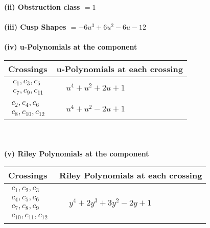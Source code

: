 \documentclass[1p]{elsarticle_modified}
\theoremstyle{definition}
\begin{document}
\flushleft \textbf{(ii) Obstruction class $= 1$}\\~\\
\flushleft \textbf{(iii) Cusp Shapes $= -6 u^3+6 u^2-6 u-12$}\\~\\
\newpage\renewcommand{\arraystretch}{1}
\flushleft \textbf{(iv) u-Polynomials at the component}\newline \\
\begin{tabular}{m{50pt}|m{274pt}}
Crossings & \hspace{64pt}u-Polynomials at each crossing \\
\hline $$\begin{aligned}c_{1},c_{3},c_{5}\\c_{7},c_{9},c_{11}\end{aligned}$$&$\begin{aligned}
&u^4+u^2+2 u+1
\end{aligned}$\\
\hline $$\begin{aligned}c_{2},c_{4},c_{6}\\c_{8},c_{10},c_{12}\end{aligned}$$&$\begin{aligned}
&u^4+u^2-2 u+1
\end{aligned}$\\
\hline
\end{tabular}\\~\\
\newpage\renewcommand{\arraystretch}{1}
\flushleft \textbf{(v) Riley Polynomials at the component}\newline \\
\begin{tabular}{m{50pt}|m{274pt}}
Crossings & \hspace{64pt}Riley Polynomials at each crossing \\
\hline $$\begin{aligned}c_{1},c_{2},c_{3}\\c_{4},c_{5},c_{6}\\c_{7},c_{8},c_{9}\\c_{10},c_{11},c_{12}\end{aligned}$$&$\begin{aligned}
&y^4+2 y^3+3 y^2-2 y+1
\end{aligned}$\\
\hline
\end{tabular}\\~\\
\end{document}
